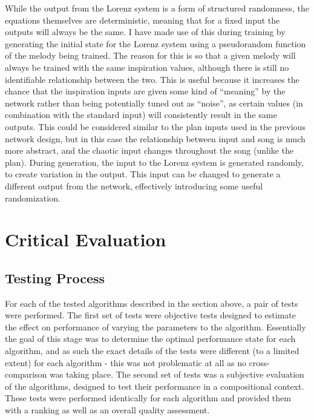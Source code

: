 \documentclass[ author={Stephen Livermore-Tozer},
				supervisor={Dr. Peter Flach},
				degree={MEng},
				title={Algorithmic Co-composition Using Machine Learning},
				subtitle={},
				type={research},
				year={2016} ]{dissertation}
\begin{document}
	While the output from the Lorenz system is a form of structured randomness, the equations themselves are deterministic, meaning that for a fixed input the outputs will always be the same. I have made use of this during training by generating the initial state for the Lorenz system using a pseudorandom function of the melody being trained. The reason for this is so that a given melody will always be trained with the same inspiration values, although there is still no identifiable relationship between the two. This is useful because it increases the chance that the inspiration inputs are given some kind of ``meaning'' by the network rather than being potentially tuned out as ``noise'', as certain values (in combination with the standard input) will consistently result in the same outputs. This could be considered similar to the plan inputs used in the previous network design, but in this case the relationship between input and song is much more abstract, and the chaotic input changes throughout the song (unlike the plan). During generation, the input to the Lorenz system is generated randomly, to create variation in the output. This input can be changed to generate a different output from the network, effectively introducing some useful randomization. 
	
	
	
	
	\chapter{Critical Evaluation}
	\label{chap:evaluation}
	
	\section{Testing Process}
	
	For each of the tested algorithms described in the section above, a pair of tests were performed. The first set of tests were objective tests designed to estimate the effect on performance of varying the parameters to the algorithm. Essentially the goal of this stage was to determine the optimal performance state for each algorithm, and as such the exact details of the tests were different (to a limited extent) for each algorithm - this was not problematic at all as no cross-comparison was taking place. The second set of tests was a subjective evaluation of the algorithms, designed to test their performance in a compositional context. These tests were performed identically for each algorithm and provided them with a ranking as well as an overall quality assessment. 
	
\end{document}
